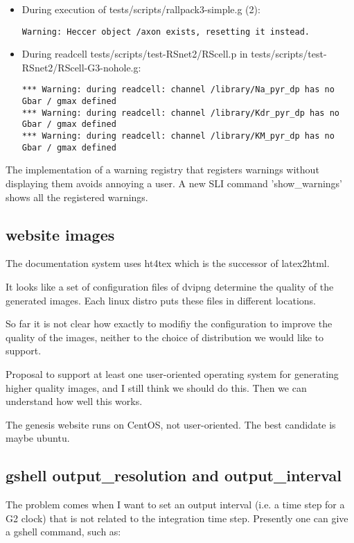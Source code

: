 \documentclass[12pt]{article}
\begin{document}
\begin{itemize}
\begin{verbatim}
\end{verbatim}
\item During execution of tests/scripts/rallpack3-simple.g (2):
\begin{verbatim}
Warning: Heccer object /axon exists, resetting it instead.
\end{verbatim}
\item During readcell tests/scripts/test-RSnet2/RScell.p in
  tests/scripts/test-RSnet2/RScell-G3-nohole.g:
\begin{verbatim}
*** Warning: during readcell: channel /library/Na_pyr_dp has no Gbar / gmax defined
*** Warning: during readcell: channel /library/Kdr_pyr_dp has no Gbar / gmax defined
*** Warning: during readcell: channel /library/KM_pyr_dp has no Gbar / gmax defined
\end{verbatim}
\end{itemize}

The implementation of a warning registry that registers warnings
without displaying them avoids annoying a user.  A new SLI command
'show\_warnings' shows all the registered warnings.


\subsection{website images}

The documentation system uses ht4tex which is the successor of
latex2html.

It looks like a set of configuration files of dvipng determine the
quality of the generated images.  Each linux distro puts these files
in different locations.

So far it is not clear how exactly to modifiy the configuration to
improve the quality of the images, neither to the choice of
distribution we would like to support.

Proposal to support at least one user-oriented operating system for
generating higher quality images, and I still think we should do this.
Then we can understand how well this works.

The genesis website runs on CentOS, not user-oriented.  The best
candidate is maybe ubuntu.


\subsection{gshell output\_resolution and output\_interval}

The problem comes when I want to set an output interval (i.e. a time
step for a G2 clock) that is not related to the integration time step.
Presently one can give a gshell command, such as:
\end{document}
